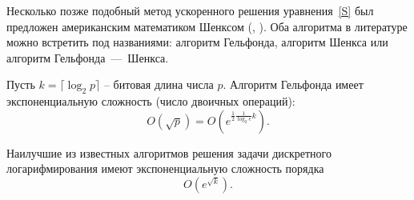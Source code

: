 Несколько позже подобный метод ускоренного решения уравнения~\ref{S} был предложен американским математиком Шенксом (, \cite{Shanks:1971}). Оба алгоритма в литературе можно встретить под названиями: алгоритм Гельфонда, алгоритм Шенкса или алгоритм Гельфонда~---~Шенкса.

Пусть $k = \lceil \log_2 p \rceil$ -- битовая длина числа $p$. Алгоритм Гельфонда имеет экспоненциальную сложность (число двоичных операций):
    \[ O\left(\sqrt{p}\right) = O\left(e^{\frac{1}{2} \frac{1}{\log_2 e} k}\right). \]

Наилучшие из известных алгоритмов решения задачи дискретного логарифмирования имеют экспоненциальную сложность порядка
    \[ O\left(e^{\sqrt{k}}\right). \]

